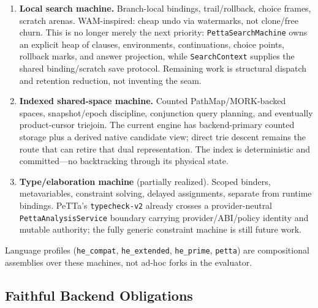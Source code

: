 \documentclass[11pt]{article}
\newcommand{\code}[1]{\texttt{#1}}
\newcommand{\PeTTa}{\textup{PeTTa}}
\begin{document}
\begin{enumerate}
\item \textbf{Local search machine.}
  Branch-local bindings, trail/rollback, choice frames, scratch arenas.
  WAM-inspired: cheap undo via watermarks, not clone/free churn.  This is
  no longer merely the next priority: \code{PettaSearchMachine} owns an
  explicit heap of clauses, environments, continuations, choice points,
  rollback marks, and answer projection, while \code{SearchContext}
  supplies the shared binding/scratch save protocol.  Remaining work is
  structural dispatch and retention reduction, not inventing the seam.

\item \textbf{Indexed shared-space machine.}
  Counted PathMap/MORK-backed spaces, snapshot/epoch discipline,
  conjunction query planning, and eventually product-cursor triejoin.
  The current engine has backend-primary counted storage plus a derived
  native candidate view; direct trie descent remains the route that can
  retire that dual representation.  The index is deterministic and
  committed---no backtracking through its physical state.

\item \textbf{Type/elaboration machine} (partially realized).
  Scoped binders, metavariables, constraint solving, delayed
  assignments, separate from runtime bindings.  \PeTTa{}'s
  \code{typecheck-v2} already crosses a provider-neutral
  \code{PettaAnalysisService} boundary carrying provider/ABI/policy
  identity and mutable authority; the fully generic constraint machine is
  still future work.
\end{enumerate}

Language profiles (\code{he\_compat}, \code{he\_extended},
\code{he\_prime}, \code{petta}) are compositional assemblies
over these machines, not ad-hoc forks in the evaluator.

\subsection{Faithful Backend Obligations}
\end{document}
